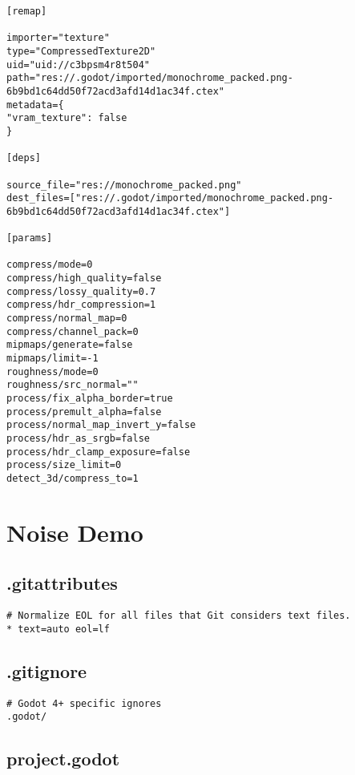 \begin{lstlisting}
[remap]

importer="texture"
type="CompressedTexture2D"
uid="uid://c3bpsm4r8t504"
path="res://.godot/imported/monochrome_packed.png-6b9bd1c64dd50f72acd3afd14d1ac34f.ctex"
metadata={
"vram_texture": false
}

[deps]

source_file="res://monochrome_packed.png"
dest_files=["res://.godot/imported/monochrome_packed.png-6b9bd1c64dd50f72acd3afd14d1ac34f.ctex"]

[params]

compress/mode=0
compress/high_quality=false
compress/lossy_quality=0.7
compress/hdr_compression=1
compress/normal_map=0
compress/channel_pack=0
mipmaps/generate=false
mipmaps/limit=-1
roughness/mode=0
roughness/src_normal=""
process/fix_alpha_border=true
process/premult_alpha=false
process/normal_map_invert_y=false
process/hdr_as_srgb=false
process/hdr_clamp_exposure=false
process/size_limit=0
detect_3d/compress_to=1
\end{lstlisting}

\section{Noise Demo}


\subsection{.gitattributes}

\begin{lstlisting}
# Normalize EOL for all files that Git considers text files.
* text=auto eol=lf
\end{lstlisting}

\subsection{.gitignore}

\begin{lstlisting}
# Godot 4+ specific ignores
.godot/
\end{lstlisting}

\subsection{project.godot}

